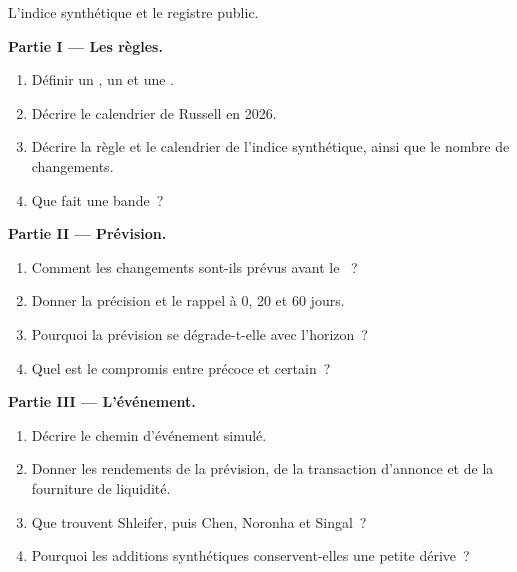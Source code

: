 \begin{problem}\label{pb:s1:index-rebalancing:1}
L'indice synthétique et le registre public.

\medskip\noindent\textbf{Partie I --- Les règles.}
\begin{enumerate}
\item Définir un , un  et une .
\item Décrire le calendrier de Russell en 2026.
\item Décrire la règle et le calendrier de l'indice synthétique, ainsi que le nombre de changements.
\item Que fait une bande~?
\end{enumerate}

\medskip\noindent\textbf{Partie II --- Prévision.}
\begin{enumerate}[resume]
\item Comment les changements sont-ils prévus avant le ~?
\item Donner la précision et le rappel à 0, 20 et 60 jours.
\item Pourquoi la prévision se dégrade-t-elle avec l'horizon~?
\item Quel est le compromis entre précoce et certain~?
\end{enumerate}

\medskip\noindent\textbf{Partie III --- L'événement.}
\begin{enumerate}[resume]
\item Décrire le chemin d'événement simulé.
\item Donner les rendements de la prévision, de la transaction d'annonce et de la fourniture de liquidité.
\item Que trouvent Shleifer, puis Chen, Noronha et Singal~?
\item Pourquoi les additions synthétiques conservent-elles une petite dérive~?
\end{enumerate}


\end{problem}
